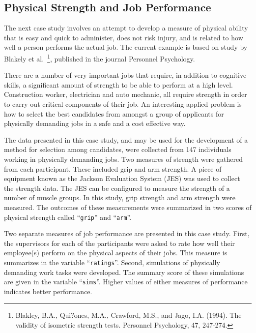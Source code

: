 \documentclass[]{krantz}
\theoremstyle{definition}
\theoremstyle{definition}
\theoremstyle{definition}
\theoremstyle{remark}
\begin{document}
\hypertarget{physical-strength-and-job-performance}{%
\subsection{Physical Strength and Job Performance}\label{physical-strength-and-job-performance}}

The next case study involves an attempt to develop a measure of physical
ability that is easy and quick to administer, does not risk injury, and
is related to how well a person performs the actual job. The current
example is based on study by Blakely et al.~\footnote{Blakley, B.A., Qui?ones, M.A., Crawford, M.S., and Jago, I.A.
  (1994). The validity of isometric strength tests. Personnel
  Psychology, 47, 247-274.}, published in the
journal Personnel Psychology.

There are a number of very important jobs that require, in addition to
cognitive skills, a significant amount of strength to be able to perform
at a high level. Construction worker, electrician and auto mechanic, all
require strength in order to carry out critical components of their job.
An interesting applied problem is how to select the best candidates from
amongst a group of applicants for physically demanding jobs in a safe
and a cost effective way.

The data presented in this case study, and may be used for the
development of a method for selection among candidates, were collected
from 147 individuals working in physically demanding jobs. Two measures
of strength were gathered from each participant. These included grip and
arm strength. A piece of equipment known as the Jackson Evaluation
System (JES) was used to collect the strength data. The JES can be
configured to measure the strength of a number of muscle groups. In this
study, grip strength and arm strength were measured. The outcomes of
these measurements were summarized in two scores of physical strength
called ``\texttt{grip}'' and ``\texttt{arm}''.

Two separate measures of job performance are presented in this case
study. First, the supervisors for each of the participants were asked to
rate how well their employee(s) perform on the physical aspects of their
jobs. This measure is summarizes in the variable ``\texttt{ratings}''. Second,
simulations of physically demanding work tasks were developed. The
summary score of these simulations are given in the variable ``\texttt{sims}''.
Higher values of either measures of performance indicates better
performance.
\end{document}
